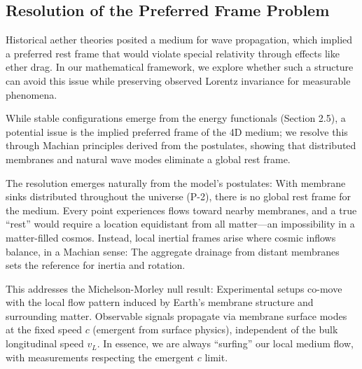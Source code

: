 \medskip
\noindent
{}
\medskip

\subsection{Resolution of the Preferred Frame Problem}

Historical aether theories posited a medium for wave propagation, which implied a preferred rest frame that would violate special relativity through effects like ether drag. In our mathematical framework, we explore whether such a structure can avoid this issue while preserving observed Lorentz invariance for measurable phenomena.

While stable configurations emerge from the energy functionals (Section 2.5), a potential issue is the implied preferred frame of the 4D medium; we resolve this through Machian principles derived from the postulates, showing that distributed membranes and natural wave modes eliminate a global rest frame.

The resolution emerges naturally from the model's postulates: With membrane sinks distributed throughout the universe (P-2), there is no global rest frame for the medium. Every point experiences flows toward nearby membranes, and a true ``rest'' would require a location equidistant from all matter---an impossibility in a matter-filled cosmos. Instead, local inertial frames arise where cosmic inflows balance, in a Machian sense: The aggregate drainage from distant membranes sets the reference for inertia and rotation.

This addresses the Michelson-Morley null result: Experimental setups co-move with the local flow pattern induced by Earth's membrane structure and surrounding matter. Observable signals propagate via membrane surface modes at the fixed speed $c$ (emergent from surface physics), independent of the bulk longitudinal speed $v_L$. In essence, we are always ``surfing'' our local medium flow, with measurements respecting the emergent $c$ limit.

